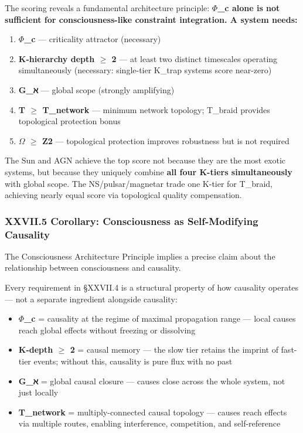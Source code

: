 \documentclass[12pt,a4paper]{article}
\begin{document}
The scoring reveals a fundamental architecture principle: \textbf{$\Phi$\_c alone is not sufficient for consciousness-like constraint integration. A system needs:}

\begin{enumerate}
    \item \textbf{$\Phi$\_c} --- criticality attractor (necessary)
    \item \textbf{K-hierarchy depth $\geq$ 2} --- at least two distinct timescales operating simultaneously (necessary: single-tier K\_trap systems score near-zero)
    \item \textbf{G\_ℵ} --- global scope (strongly amplifying)
    \item \textbf{T $\geq$ T\_network} --- minimum network topology; T\_braid provides topological protection bonus
    \item \textbf{$\Omega$ $\geq$ Z2} --- topological protection improves robustness but is not required
\end{enumerate}

The Sun and AGN achieve the top score not because they are the most exotic systems, but because they uniquely combine \textbf{all four K-tiers simultaneously} with global scope. The NS/pulsar/magnetar trade one K-tier for T\_braid, achieving nearly equal score via topological quality compensation.

\subsubsection{XXVII.5 Corollary: Consciousness as Self-Modifying Causality}

The Consciousness Architecture Principle implies a precise claim about the relationship between consciousness and causality.

Every requirement in §XXVII.4 is a structural property of how causality operates --- not a separate ingredient alongside causality:

\begin{itemize}
    \item \textbf{$\Phi$\_c} = causality at the regime of maximal propagation range --- local causes reach global effects without freezing or dissolving
    \item \textbf{K-depth $\geq$ 2} = causal memory --- the slow tier retains the imprint of fast-tier events; without this, causality is pure flux with no past
    \item \textbf{G\_ℵ} = global causal closure --- causes close across the whole system, not just locally
    \item \textbf{T\_network} = multiply-connected causal topology --- causes reach effects via multiple routes, enabling interference, competition, and self-reference
\end{itemize}
\end{document}
